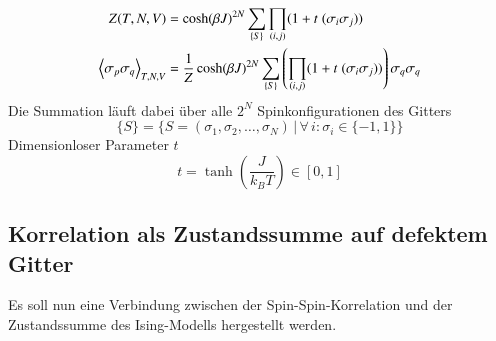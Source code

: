 \begin{grayframe}[frametitle = {Zustandssumme und Spin-Spin-Korrelation für 2d Ising-Modell \cite{StatPhys_Nolting_K4}}]
\begin{align}
 Z(T,N,V)  
  & = \cosh(\beta J)^{2N} \sum_{\{S\}} \prod_{(i,j)} (1 +  t \; (\sigma_i \sigma_j)) \label{Ising_Zustandssumme} \\
\left\langle \sigma_{p} \sigma_{q}  \right\rangle_{T,N,V} 
  & = \frac{1}{Z} \cosh(\beta J)^{2N} \sum_{\{S\}} \left(\prod_{(i,j)} (1 +  t \; (\sigma_i \sigma_j) )\right) \sigma_{q} \sigma_{q} \label{Ising_SpinSpinCorrelation}
\end{align}
\centering
\noindent Die Summation läuft dabei über alle $2^N$ Spinkonfigurationen des Gitters
$$\{S\} = \{S = (\sigma_1, \sigma_2, \dots,\sigma_N) \,\vert\, \forall\,i : \sigma_i \in \{-1, 1\}\}$$
\noindent Dimensionloser Parameter $t$
$$ t = \tanh(\frac{J}{k_B T})\in [0,1]$$
\end{grayframe}

\subsection{Korrelation als Zustandssumme auf defektem Gitter} 

Es soll nun eine Verbindung zwischen der Spin-Spin-Korrelation und der Zustandssumme des Ising-Modells hergestellt werden. 


